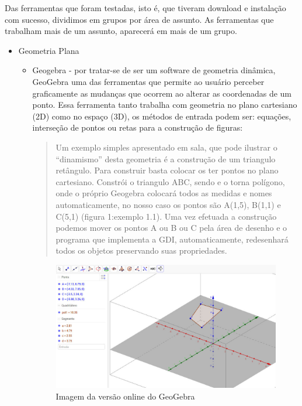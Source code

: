 \documentclass[12pt,a4paper]{article}
\begin{document}
Das ferramentas que foram testadas, isto é, que tiveram download e instalação com sucesso, dividimos em grupos por área de assunto. As ferramentas que trabalham mais de um assunto, aparecerá em mais de um grupo.
         \begin{itemize}
            \item Geometria Plana
            \begin{itemize}
                \item Geogebra - por tratar-se de ser um software de geometria dinâmica, GeoGebra uma das ferramentas que permite ao usuário perceber graficamente as mudanças que ocorrem ao alterar as coordenadas de um ponto. Essa ferramenta tanto trabalha com geometria no plano cartesiano (2D) como no espaço (3D), os métodos de entrada podem ser: equações, interseção de pontos ou retas para a construção de figuras:
                
\begin{quotation}
Um exemplo simples apresentado em sala, que pode ilustrar o “dinamismo” desta geometria é a construção de um triangulo retângulo. Para construir basta colocar os ter pontos no plano cartesiano. Constrói o triangulo ABC, sendo e o torna polígono, onde o próprio Geogebra colocará todos as medidas e nomes automaticamente, no nosso caso os pontos são A(1,5), B(1,1) e C(5,1) (figura 1:exemplo 1.1). Uma vez efetuada a construção podemos mover os pontos A ou B ou C pela área de desenho e o programa que implementa a GDI, automaticamente, redesenhará todos os objetos preservando suas propriedades.\end{quotation}\citep{cardoso2010software}

\begin{figure}[!h]
\centering
\includegraphics[scale=0.23]{imagens/geo.jpg} 
\caption{Imagem da versão online do GeoGebra}
\end{figure}


\end{itemize}
\end{itemize}
\end{document}
